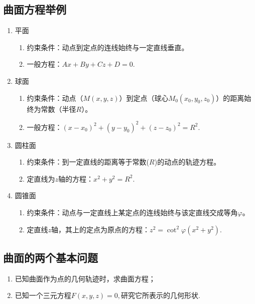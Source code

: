 \subsection{曲面方程举例}
\begin{enumerate}[1.]
	\setlength{\topsep}{0.01em}
	\setlength{\itemsep}{0.01em}
	\item {\color{dy}平面}
	\begin{enumerate}[(1)]
		\setlength{\topsep}{0.01em}
		\setlength{\itemsep}{0.01em}
		\item 约束条件：动点到定点的连线始终与一定直线垂直。
		\item 一般方程：$Ax+By+Cz+D=0.$
	\end{enumerate}
	\item {\color{dy}球面}\label{球面}
	\begin{enumerate}[(1)]
		\setlength{\topsep}{0.01em}
		\setlength{\itemsep}{0.01em}
		\item 约束条件：动点（$M(x,y,z)$）到定点（球心$M_0(x_0,y_0,z_0)$）的距离始终为常数（半径$R$）。
		\item 一般方程：$(x-x_0)^2+(y-y_0)^2+(z-z_0)^2=R^2.$
	\end{enumerate}
	\newpage
	\item {\color{dy}圆柱面}\label{圆柱面}
	\begin{enumerate}[(1)]
		\setlength{\topsep}{0.01em}
		\setlength{\itemsep}{0.01em}
		\item 约束条件：到一定直线的距离等于常数($R$)的动点的轨迹方程。
		\item 定直线为$z$轴的方程：$x^2+y^2=R^2.$
	\end{enumerate}
	\item {\color{dy}圆锥面}\label{圆锥面}
	\begin{enumerate}[(1)]
		\setlength{\topsep}{0.01em}
		\setlength{\itemsep}{0.01em}
		\item 约束条件：动点与一定直线上某定点的连线始终与该定直线交成等角$\varphi $。
		\item 定直线$z$轴，其上的定点为原点的方程：$z^2=\cot^2 \varphi(x^2+y^2).$
	\end{enumerate}
\end{enumerate}
\subsection{曲面的两个基本问题}
\begin{enumerate}[1.]
	\setlength{\itemindent}{2em}
	\setlength{\topsep}{0.01em}
	\setlength{\itemsep}{0.01em}
	\item 已知曲面作为点的几何轨迹时，求曲面方程；
	\item 已知一个三元方程$F(x,y,z)=0,$研究它所表示的几何形状.
\end{enumerate}

